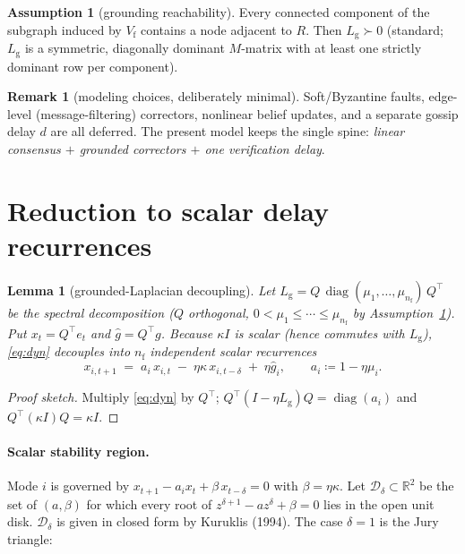 \documentclass[11pt]{article}
\newtheorem{lemma}{Lemma}
\theoremstyle{definition}
\newtheorem{assumption}{Assumption}
\newtheorem{remark}{Remark}
\newcommand{\R}{\mathbb{R}}
\newcommand{\Lg}{L_{\mathrm g}}
\DeclareMathOperator{\diag}{diag}
\begin{document}
\begin{assumption}[grounding reachability]\label{ass:reach}
Every connected component of the subgraph induced by $V_{\mathrm f}$ contains a node adjacent
to $R$. Then $\Lg\succ 0$ (standard; $\Lg$ is a symmetric, diagonally dominant $M$-matrix with
at least one strictly dominant row per component).
\end{assumption}

\begin{remark}[modeling choices, deliberately minimal]
Soft/Byzantine faults, edge-level (message-filtering) correctors, nonlinear belief updates,
and a separate gossip delay $d$ are all deferred. The present model keeps the single spine:
\emph{linear consensus $+$ grounded correctors $+$ one verification delay}.
\end{remark}

\section{Reduction to scalar delay recurrences}

\begin{lemma}[grounded-Laplacian decoupling]\label{lem:decouple}
Let $\Lg = Q\,\diag(\mu_1,\dots,\mu_{n_{\mathrm f}})\,Q^\top$ be the spectral decomposition
($Q$ orthogonal, $0<\mu_1\le\cdots\le\mu_{n_{\mathrm f}}$ by Assumption~\ref{ass:reach}).
Put $x_t = Q^\top e_t$ and $\hat g = Q^\top g$. Because $\kappa I$ is scalar (hence commutes
with $\Lg$), \eqref{eq:dyn} decouples into $n_{\mathrm f}$ independent scalar recurrences
\begin{equation}\label{eq:mode}
  x_{i,t+1} \;=\; a_i\,x_{i,t} \;-\; \eta\kappa\, x_{i,t-\delta} \;+\; \eta\hat g_i,
  \qquad a_i \coloneqq 1-\eta\mu_i .
\end{equation}
\end{lemma}
\begin{proof}[Proof sketch] Multiply \eqref{eq:dyn} by $Q^\top$; $Q^\top(I-\eta\Lg)Q
=\diag(a_i)$ and $Q^\top(\kappa I)Q=\kappa I$. \end{proof}

\paragraph{Scalar stability region.} Mode $i$ is governed by
$x_{t+1}-a_i x_t+\beta\,x_{t-\delta}=0$ with $\beta=\eta\kappa$. Let
$\mathcal D_\delta\subset\R^2$ be the set of $(a,\beta)$ for which every root of
$z^{\delta+1}-a z^{\delta}+\beta=0$ lies in the open unit disk. $\mathcal D_\delta$ is given in
closed form by Kuruklis (1994). The case $\delta=1$ is the Jury triangle:
\end{document}
